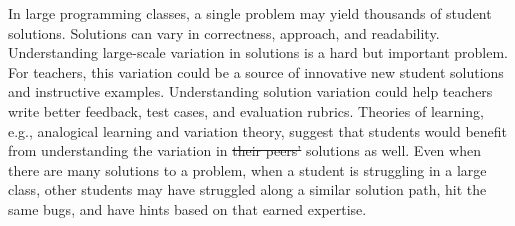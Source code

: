 \documentclass[12pt,twoside]{mitthesis}
\providecommand{\DIFaddtex}[1]{{\protect\color{blue}\uwave{#1}}} %
\providecommand{\DIFdeltex}[1]{{\protect\color{red}\sout{#1}}}                      %
\providecommand{\DIFaddbegin}{} %
\providecommand{\DIFaddend}{} %
\providecommand{\DIFdelbegin}{} %
\providecommand{\DIFdelend}{} %
\providecommand{\DIFadd}[1]{\texorpdfstring{\DIFaddtex{#1}}{#1}} %
\providecommand{\DIFdel}[1]{\texorpdfstring{\DIFdeltex{#1}}{}} %
\begin{document}
\cleardoublepage
\pagestyle{empty}
\setcounter{savepage}{\thepage}
\begin{abstractpage}
\DIFdelbegin %

\DIFdelend In large programming classes, a single problem may yield thousands of student solutions. Solutions can vary in correctness, approach, and readability. Understanding large-scale variation in solutions is a hard but important problem. For teachers, this variation could be a source of innovative new student solutions and instructive examples. Understanding solution variation could help teachers write better feedback, test cases, and evaluation rubrics. Theories of learning, e.g., analogical learning and variation theory, suggest that students would benefit from understanding the variation in \DIFdelbegin \DIFdel{their peers' }\DIFdelend \DIFaddbegin \DIFadd{the fellow student }\DIFaddend solutions as well. Even when there are many solutions to a problem, when a student is struggling in a large class, other students may have struggled along a similar solution path, hit the same bugs, and have hints based on that earned expertise.


\end{abstractpage}
\end{document}
